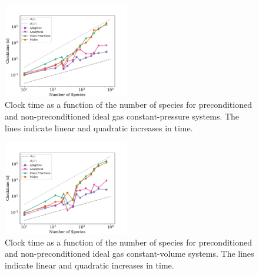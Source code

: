 \documentclass[twocolumn,10pt]{article}
\begin{document}
\begin{figure}[htb]
\centering
\includegraphics[width=0.49\textwidth]{figures/Clocktime-Nspecies-pressure_problem.pdf}
\caption{Clock time as a function of the number of species for preconditioned and non-preconditioned ideal gas constant-pressure systems.
The lines indicate linear and quadratic increases in time.}
\label{f:clocktime-nspecies-pressure}
\end{figure}

\begin{figure}[htb]
\centering
\includegraphics[width=0.49\textwidth]{figures/Clocktime-Nspecies-volume_problem.pdf}
\caption{Clock time as a function of the number of species for preconditioned and non-preconditioned ideal gas constant-volume systems.
The lines indicate linear and quadratic increases in time.}
\label{f:clocktime-nspecies-volume}
\end{figure}
\end{document}
